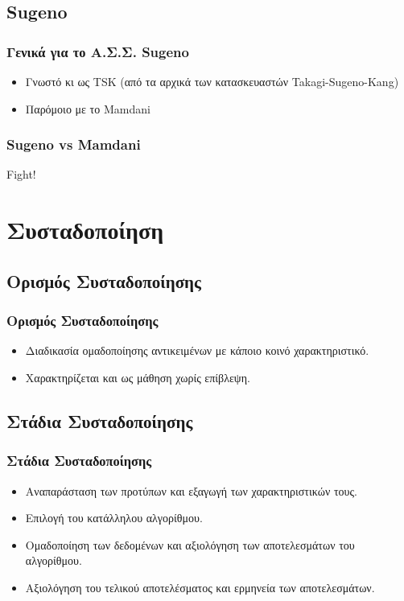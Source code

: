 \documentclass[xetex,serif,mathserif,14pt]{beamer}
\begin{document}
\subsection{Sugeno}

\begin{frame}
\frametitle{Γενικά για το Α.Σ.Σ. Sugeno}
\begin{itemize}
  \item Γνωστό κι ως TSK (από τα αρχικά των κατασκευαστών Takagi-Sugeno-Kang)
  \item Παρόμοιο με το Mamdani
\end{itemize}
\end{frame}

\begin{frame}
\frametitle{Sugeno vs Mamdani}
Fight!
\end{frame}


\section{Συσταδοποίηση}

\subsection{Ορισμός Συσταδοποίησης}

\begin{frame}
\frametitle{Ορισμός Συσταδοποίησης}
\begin{itemize}
  \item Διαδικασία ομαδοποίησης αντικειμένων με κάποιο κοινό χαρακτηριστικό.\pause
  \item Χαρακτηρίζεται και ως μάθηση χωρίς επίβλεψη.
\end{itemize}
\end{frame}

\subsection{Στάδια Συσταδοποίησης}

\begin{frame}
\frametitle{Στάδια Συσταδοποίησης}
\begin{itemize}
  \item Αναπαράσταση των προτύπων και εξαγωγή των χαρακτηριστικών τους.\pause
  \item Επιλογή  του  κατάλληλου  αλγορίθμου.\pause
  \item Ομαδοποίηση των δεδομένων και αξιολόγηση των αποτελεσμάτων του αλγορίθμου.\pause
  \item Αξιολόγηση του τελικού αποτελέσματος και ερμηνεία των αποτελεσμάτων.
\end{itemize}
\end{frame}
\end{document}
